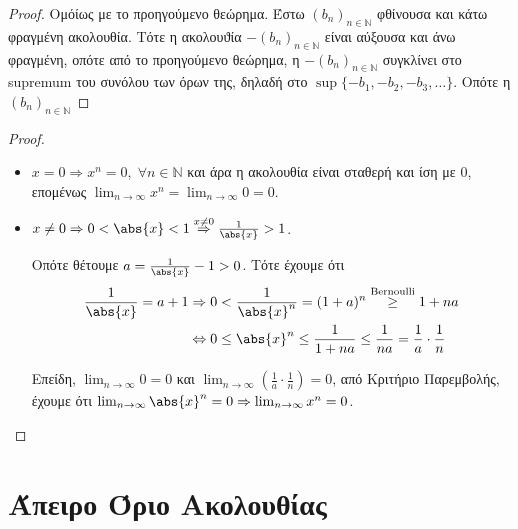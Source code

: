 \documentclass[main.tex]{subfiles}
\begin{document}

\begin{proof}
  Ομόίως με το προηγούμενο θεώρημα. Έστω 
  $ (b_{n})_{n \in \mathbb{N}} $ 
  φθίνουσα και κάτω φραγμένη ακολουθία. Τότε η ακολουϑία 
  $ -(b_{n})_{n \in \mathbb{N}} $ είναι αύξουσα και άνω φραγμένη, 
  οπότε από το προηγούμενο θεώρημα, η $ -(b_{n})_{n \in \mathbb{N}} $
  συγκλίνει στο supremum του συνόλου των όρων της, δηλαδή στο  
  $ \sup \{ - b_{1}, - b_{2}, -b_{3}, \ldots \}$. Οπότε η 
  $ (b_{n})_{n \in \mathbb{N}} $ 
\end{proof}


\begin{proof}
\item {}
  \begin{itemize}
    \item $ x = 0 \Rightarrow x^{n} = 0, \; \forall n \in 
      \mathbb{N} $ και άρα η ακολουθία είναι σταθερή και ίση με 
      0, επομένως 
      $ \lim_{n \to \infty} x^{n} = \lim_{n \to \infty} 0 = 0 $.

    \item $ x \neq 0 \Rightarrow 0 < \abs{x} < 1 
      \overset{x \neq 0}{\Rightarrow} \frac{1}{\abs{x}} > 1  $. 

      Οπότε θέτουμε $ a = \frac{1}{\abs{x}} - 1 > 0 $. Τότε έχουμε ότι 
      \begin{align*} 
        \frac{1}{\abs{x}} = a+1 
                    &\Rightarrow 0< \frac{1}{\abs{x}^{n}}  = (1+a)^{n}
                    \overset{\text{Bernoulli}}{\geq} 1 + na \\ 
                    & \Leftrightarrow 0 \leq \abs{x}^{n} \leq 
                    \frac{1}{1+na} \leq \frac{1}{na} = \frac{1}{a} 
                    \cdot \frac{1}{n} 
      \end{align*} 

      Επείδη, $ \lim_{n \to \infty} 0 = 0 $ και 
      $ \lim_{n \to \infty} \left(\frac{1}{a} \cdot \frac{1}{n} 
      \right) = 0$, από Κριτήριο Παρεμβολής, έχουμε ότι 
      $ \lim_{n \to \infty} \abs{x} ^{n} = 
      0 \Rightarrow \lim_{n \to \infty}x^{n} = 0$.
  \end{itemize}
\end{proof}


\section{Άπειρο Όριο Ακολουθίας}
\end{document}
